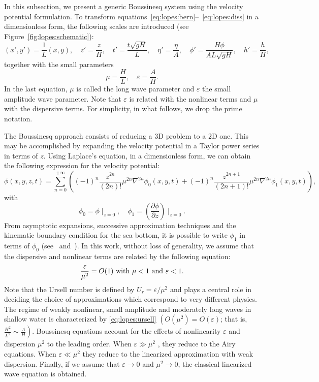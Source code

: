 In this subsection, we present a generic Boussinesq system using the
velocity potential formulation.  To transform
equations~\eqref{eq:lopes:bern}--~\eqref{eq:lopes:diss} in a
dimensionless form, the following scales are introduced (see
Figure~\ref{fig:lopes:schematic}):
\begin{equation}
( x', y')=\frac{1}{L}(x,y),\quad z'=\frac{z}{H}, \quad
t'=\frac{t\sqrt{gH}}{L},\quad \eta'=\frac{\eta}{A},\quad
\phi'= \frac{H\phi}{AL\sqrt{gH}},\quad h'=\frac{h}{H},
\end{equation}
together with the small parameters
\begin{equation}
  \mu=\frac{H}{L},\quad \varepsilon=\frac{A}{H}.
\end{equation}
In the last equation, $\mu$ is called the long wave parameter and
$\varepsilon$ the small amplitude wave parameter.  Note that
$\varepsilon$ is related with the nonlinear terms and $\mu$ with the
dispersive terms.  For simplicity, in what follows, we drop the prime
notation.

The Boussinesq approach consists of reducing a $3$D problem to a $2$D
one.  This may be accomplished by expanding the velocity potential in
a Taylor power series in terms of $z$.  Using Laplace's equation, in a
dimensionless form, we can obtain the following expression for the
velocity potential:
\begin{equation}
\phi(x,y,z,t) = \sum_{n=0}^{+\infty} \left((-1)^n \frac{z^{2n}}{(2n)!}
  \mu^{2n}\nabla^{2n}\phi_0(x,y,t) + (-1)^n \frac{z^{2n+1}}{(2n+1)!}
  \mu^{2n}\nabla^{2n}\phi_1(x,y,t)\right),
\end{equation}
with
\begin{equation}
  \phi_0=\phi\mid_{ z=0},\quad
  \phi_1=\left(\frac{\partial \phi}{\partial z}\right)\mid_{z=0}\!.
\end{equation}
From asymptotic expansions, successive approximation techniques and
the kinematic boundary condition for the sea bottom, it is possible to
write $\phi_1$ in terms of $\phi_0$ (see~\citet{ChenLiu1994}
and~\citet{ZhaoTengCheng2004}).  In this work, without loss of
generality, we assume that the dispersive and nonlinear terms are
related by the following equation:
\begin{equation}
  \label{eq:lopes:ursell}
  \frac{\varepsilon}{\mu^2}=O(1)\ {\rm with}\ \mu<1\ {\rm
    and}\ \varepsilon<1.
\end{equation}
Note that the Ursell number is defined by
$U_r = \varepsilon/\mu^2$ and plays a central role in deciding
the choice of approximations which correspond to very different
physics.  The regime of weakly nonlinear, small amplitude and
moderately long waves in shallow water is characterized by
\eqref{eq:lopes:ursell} $\left(O(\mu^2)=O(\varepsilon)\right.$; that
is, $\left.\frac{H^2}{L^2}\sim\frac{A}{H} \right)$. Boussinesq
equations account for the effects of nonlinearity $\varepsilon$ and
dispersion $\mu^2$ to the leading order.  When $\varepsilon\gg \mu^2$
, they reduce to the Airy equations.  When $\varepsilon\ll \mu^2$ they
reduce to the linearized approximation with weak dispersion.  Finally,
if we assume that $\varepsilon\rightarrow 0$ and $\mu^2\rightarrow 0$,
the classical linearized wave equation is obtained.

